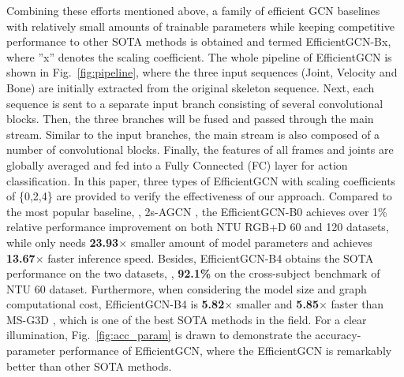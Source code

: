 \documentclass[10pt,journal,compsoc]{IEEEtran}
\begin{document}
Combining these efforts mentioned above, a family of efficient GCN baselines with relatively small amounts of trainable parameters while keeping competitive performance to other SOTA methods is obtained and termed EfficientGCN-Bx, where ''x'' denotes the scaling coefficient. The whole pipeline of EfficientGCN is shown in Fig.~\ref{fig:pipeline}, where the three input sequences (Joint, Velocity and Bone) are initially extracted from the original skeleton sequence. Next, each sequence is sent to a separate input branch consisting of several convolutional blocks. Then, the three branches will be fused and passed through the main stream. Similar to the input branches, the main stream is also composed of a number of convolutional blocks. Finally, the features of all frames and joints are globally averaged and fed into a Fully Connected (FC) layer for action classification. In this paper, three types of EfficientGCN with scaling coefficients of \{0,2,4\} are provided to verify the effectiveness of our approach. Compared to the most popular baseline, \ie, 2s-AGCN \cite{shi2019two}, the EfficientGCN-B0 achieves over 1\% relative performance improvement on both NTU RGB+D 60 \cite{shahroudy2016ntu} and 120 \cite{liu2019ntu} datasets, while only needs {\bf 23.93$\times$} smaller amount of model parameters and achieves {\bf 13.67$\times$} faster inference speed. Besides, EfficientGCN-B4 obtains the SOTA performance on the two datasets, \eg, {\bf 92.1\%} on the cross-subject benchmark of NTU 60 dataset. Furthermore, when considering the model size and graph computational cost, EfficientGCN-B4 is {\bf 5.82$\times$} smaller and {\bf 5.85$\times$} faster than MS-G3D \cite{liu2020disentangling}, which is one of the best SOTA methods in the field. For a clear illumination, Fig.~\ref{fig:acc_param} is drawn to demonstrate the accuracy-parameter performance of EfficientGCN, where the EfficientGCN is remarkably better than other SOTA methods.
\end{document}
